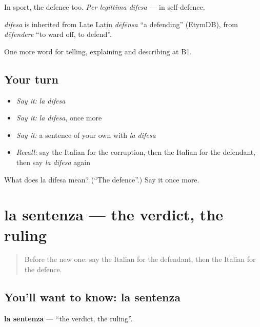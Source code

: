 In sport, the defence too. \emph{Per legittima difesa} — in self-defence.

\begin{cousinweb}
\emph{difesa} is inherited from Late Latin \emph{dēfēnsa} \textquotedblleft{}a defending\textquotedblright{} (EtymDB), from \emph{dēfendere} \textquotedblleft{}to ward off, to defend\textquotedblright{}.
\end{cousinweb}

\begin{grammarlens}[title={What you've built}]
One more word for telling, explaining and describing at B1.
\end{grammarlens}

\subsection*{Your turn}
\begin{itemize}
\raggedright
  \item \emph{Say it:} \emph{la difesa}
  \item \emph{Say it:} \emph{la difesa}, once more
  \item \emph{Say it:} a sentence of your own with \emph{la difesa}
  \item \emph{Recall:} say the Italian for the corruption, then the Italian for the defendant, then say \emph{la difesa} again
\end{itemize}

\begin{tcolorbox}[breakable,colback=teal!4,colframe=teal!35!black,title={Before you move on}]
What does la difesa mean? (\textquotedblleft{}The defence\textquotedblright{}.) Say it once more.
\end{tcolorbox}
\section[la sentenza]{la sentenza — the verdict, the ruling}

\label{lesson:IT-C392-sentenza}



\begin{quote}
Before the new one: say the Italian for the defendant, then the Italian for the defence.
\end{quote}

\subsection*{You'll want to know: la sentenza}
\textbf{la sentenza} — \textquotedblleft{}the verdict, the ruling\textquotedblright{}.

